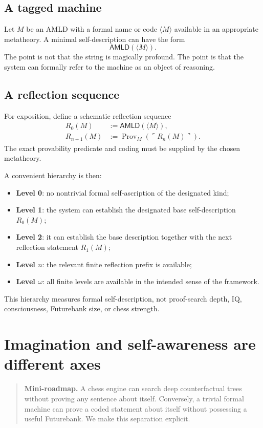 \documentclass[11pt,openany]{book}
\theoremstyle{definition}
\theoremstyle{remark}
\newenvironment{miniroadmap}{\begin{quote}\small\color{deepblue}\textbf{Mini-roadmap.} }{\end{quote}}
\newcommand{\Prov}{\operatorname{Prov}}
\newcommand{\AMLD}{\ensuremath{\mathsf{AMLD}}\xspace}
\begin{document}
\section{A tagged machine}
Let $M$ be an AMLD with a formal name or code $\langle M\rangle$ available in an appropriate metatheory. A minimal self-description can have the form
\[
\AMLD(\langle M\rangle).
\]
The point is not that the string is magically profound. The point is that the system can formally refer to the machine as an object of reasoning.

\section{A reflection sequence}
For exposition, define a schematic reflection sequence
\begin{align*}
R_0(M)&:=\AMLD(\langle M\rangle),\\
R_{n+1}(M)&:=\Prov_M(\ulcorner R_n(M)\urcorner).
\end{align*}
The exact provability predicate and coding must be supplied by the chosen metatheory.

A convenient hierarchy is then:
\begin{itemize}
\item \textbf{Level 0}: no nontrivial formal self-ascription of the designated kind;
\item \textbf{Level 1}: the system can establish the designated base self-description $R_0(M)$;
\item \textbf{Level 2}: it can establish the base description together with the next reflection statement $R_1(M)$;
\item \textbf{Level $n$}: the relevant finite reflection prefix is available;
\item \textbf{Level $\omega$}: all finite levels are available in the intended sense of the framework.
\end{itemize}
This hierarchy measures formal self-description, not proof-search depth, IQ, consciousness, Futurebank size, or chess strength.

\chapter{Imagination and self-awareness are different axes}
\begin{miniroadmap}
A chess engine can search deep counterfactual trees without proving any sentence about itself. Conversely, a trivial formal machine can prove a coded statement about itself without possessing a useful Futurebank. We make this separation explicit.
\end{miniroadmap}
\end{document}
